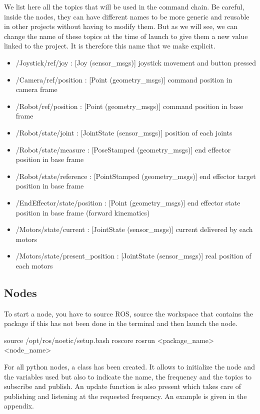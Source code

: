 We list here all the topics that will be used in the command chain. Be careful, inside the nodes, they can have different names to be more generic and reusable in other projects without having to modify them. But as we will see, we can change the name of these topics at the time of launch to give them a new value linked to the project. It is therefore this name that we make explicit. 
\begin{itemize}
    \item /Joystick/ref/joy : [Joy (sensor\_msgs)] joystick movement and button pressed
    \item /Camera/ref/position : [Point (geometry\_msgs)] command position in camera frame
    \item /Robot/ref/position : [Point (geometry\_msgs)] command position in base frame
    \item /Robot/state/joint : [JointState (sensor\_msgs)] position of each joints
    \item /Robot/state/measure : [PoseStamped (geometry\_msgs)] end effector position in base frame
    \item /Robot/state/reference : [PointStamped (geometry\_msgs)] end effector target position in base frame
    \item /EndEffector/state/position : [Point (geometry\_msgs)] end effector state position in base frame (forward kinematics)
    \item /Motors/state/current : [JointState (sensor\_msgs)] current delivered by each motors
    \item /Motors/state/present\_position : [JointState (sensor\_msgs)] real position of each motors
\end{itemize}

\subsection{Nodes}
To start a node, you have to source ROS, source the workspace that contains the package if this has not been done in the terminal and then launch the node.
\begin{commandshell}
    source /opt/ros/noetic/setup.bash
    roscore
    rosrun <package_name> <node_name>
\end{commandshell}

\bigbreak
For all python nodes, a class has been created. It allows to initialize the node and the variables used but also to indicate the name, the frequency and the topics to subscribe and publish. An update function is also present which takes care of publishing and listening at the requested frequency. An example is given in the appendix.

